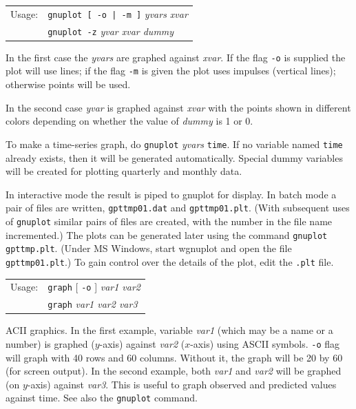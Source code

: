 \documentclass{article}
\begin{document}
{\clearpage


\begin{tabular}{ll}
Usage: &  \texttt{gnuplot [ -o | -m ]} \textit{yvars xvar} \\
       &  \texttt{gnuplot -z} \textit{yvar xvar dummy}
\end{tabular}

In the first case the \textit{yvars} are graphed against
\textit{xvar}.  If the flag \texttt{-o} is supplied the plot will use
lines; if the flag \texttt{-m} is given the plot uses impulses
(vertical lines); otherwise points will be used.

In the second case \textit{yvar} is graphed against \textit{xvar} with
the points shown in different colors depending on whether the value of
\textit{dummy} is 1 or 0.

To make a time-series graph, do \texttt{gnuplot} \textit{yvars}
\texttt{time}.  If no variable named \texttt{time} already exists,
then it will be generated automatically.  Special dummy variables will
be created for plotting quarterly and monthly data.

In interactive mode the result is piped to gnuplot for display.  In
batch mode a pair of files are written, \texttt{gpttmp01.dat} and
\texttt{gpttmp01.plt}.  (With subsequent uses of \texttt{gnuplot}
similar pairs of files are created, with the number in the file name
incremented.) The plots can be generated later using the command
\texttt{gnuplot gpttmp.plt}.  (Under MS Windows, start wgnuplot and
open the file \texttt{gpttmp01.plt}.)  To gain control over the details
of the plot, edit the \texttt{.plt} file.


\begin{tabular}{ll}
Usage: &        \texttt{graph} [ \texttt{-o} ] \textit{var1 var2} \\
       &        \texttt{graph} \textit{var1 var2 var3} 
\end{tabular}

ACII graphics.  In the first example, variable \textit{var1} (which
may be a name or a number) is graphed ($y$-axis) against \textit{var2}
($x$-axis) using ASCII symbols.  \texttt{-o} flag will graph with 40
rows and 60 columns.  Without it, the graph will be 20 by 60 (for
screen output).  In the second example, both \textit{var1} and
\textit{var2} will be graphed (on $y$-axis) against \textit{var3}.
This is useful to graph observed and predicted values against time.
See also the \texttt{gnuplot} command.

}
\end{document}
